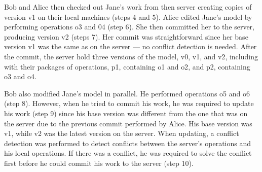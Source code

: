 Bob and Alice then checked out Jane's work from then server creating copies of version \textsf{v1} on their local machines (steps 4 and 5).  Alice edited Jane's model by performing operations \textsf{o3} and \textsf{04} (step 6). She then committed her to the server, producing version \textsf{v2} (steps 7). Her commit was straightforward since her base version \textsf{v1} was the same as on the server --- no conflict detection is needed. After the commit, the server hold three versions of the model, \textsf{v0}, \textsf{v1}, and \textsf{v2}, including with their packages of operations, \textsf{p1}, containing \textsf{o1} and \textsf{o2}, and \textsf{p2}, containing \textsf{o3} and \textsf{o4}.

Bob also modified Jane's model in parallel. He performed operations \textsf{o5} and \textsf{o6} (step 8). However, when he tried to commit his work, he was required to update his work (step 9) since his base version was different from the one that was on the server due to the previous commit performed by Alice. His base version was \textsf{v1}, while \textsf{v2} was the latest version on the server. When updating, a conflict detection was performed to detect conflicts between the server's operations and his local operations. If there was a conflict, he was required to solve the conflict first before he could commit his work to the server (step 10).

